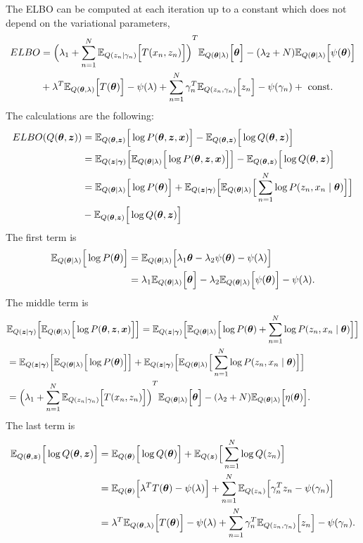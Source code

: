 The ELBO can be computed at each iteration up to a constant which does not depend on the variational parameters,
\[
  \begin{aligned}
    ELBO &= {\Big( \lambda_{1} + \sum_{n=1}^{N} \mathbb{E}_{Q(z_{n}\mid \gamma_{n})}\Big[T(x_{n},z_{n})\Big]\Big)}^{T}\mathbb{E}_{Q(\bm{\theta} \mid \lambda)}\Big[\bm{\theta}\Big] - (\lambda_{2} + N) \mathbb{E}_{Q(\bm{\theta} \mid \lambda)}\Big[\psi(\bm{\theta})\Big]\\
    &+ \lambda ^{T} \mathbb{E}_{Q(\bm{\theta}, \lambda)}\Big[T(\bm{\theta})\Big] - \psi(\lambda) + \sum_{n=1}^{N}\gamma_{n}^{T}\mathbb{E}_{Q(z_{n}, \gamma_{n})}\Big[z_{n}\Big] - \psi(\gamma_{n}) + \text{ const. }
  \end{aligned}
\]
The calculations are the following:
\[
  \begin{aligned}
   ELBO(Q(\bm{\theta}, \bm{z})) &= \mathbb{E}_{Q(\bm{\theta}, \bm{z})}\Big[\log{P(\bm{\theta}, \bm{z}, \bm{x})}\Big] - \mathbb{E}_{Q(\bm{\theta}, \bm{z})}\Big[\log{Q(\bm{\theta}, \bm{z})}\Big]\\
  &= \mathbb{E}_{Q(\bm{z} \mid \bm{\gamma})}\Big[\mathbb{E}_{Q(\bm{\theta} \mid \lambda)}\Big[\log P(\bm{\theta}, \bm{z}, \bm{x})\Big]\Big]- \mathbb{E}_{Q(\bm{\theta}, \bm{z})}\Big[\log{Q(\bm{\theta}, \bm{z})}\Big]\\
  &= \mathbb{E}_{Q(\bm{\theta} \mid \lambda)}\Big[\log P(\bm{\theta})\Big] + \mathbb{E}_{Q(\bm{z} \mid \bm{\gamma})}\Big[\mathbb{E}_{Q(\bm{\theta} \mid \lambda)}\Big[\sum_{n=1}^{N} \log P(z_{n}, x_{n} \mid \bm{\theta})\Big]\Big]\\
  &- \mathbb{E}_{Q(\bm{\theta}, \bm{z})}\Big[\log{Q(\bm{\theta}, \bm{z})}\Big]
  \end{aligned}
\]
The first term is
\[
  \begin{aligned}
  \mathbb{E}_{Q(\bm{\theta} \mid \lambda)}\Big[\log P(\bm{\theta})\Big] &=  \mathbb{E}_{Q(\bm{\theta} \mid \lambda)}\Big[ \lambda_{1}\bm{\theta} - \lambda_{2}\psi(\bm{\theta}) - \psi(\lambda) \Big]\\
  &= \lambda_{1}  \mathbb{E}_{Q(\bm{\theta} \mid \lambda)}\Big[\bm{\theta}\Big] - \lambda_{2}\mathbb{E}_{Q(\bm{\theta} \mid \lambda)}\Big[\psi(\bm{\theta})\Big] - \psi(\lambda).
  \end{aligned}
\]
The middle term is 
\[
 \begin{aligned}
    &\mathbb{E}_{Q(\bm{z} \mid \bm{\gamma})}\Big[\mathbb{E}_{Q(\bm{\theta} \mid \lambda)}\Big[\log P(\bm{\theta}, \bm{z}, \bm{x})\Big]\Big] =  \mathbb{E}_{Q(\bm{z} \mid \bm{\gamma})}\Big[\mathbb{E}_{Q(\bm{\theta} \mid \lambda)}\Big[\log P(\bm{\theta}) + \sum_{n=1}^{N} \log P(z_{n}, x_{n} \mid \bm{\theta})\Big]\Big]\\
    &= \mathbb{E}_{Q(\bm{z} \mid \bm{\gamma})}\Big[\mathbb{E}_{Q(\bm{\theta} \mid \lambda)}\Big[\log P(\bm{\theta})\Big]\Big] + \mathbb{E}_{Q(\bm{z} \mid \bm{\gamma})}\Big[\mathbb{E}_{Q(\bm{\theta} \mid \lambda)}\Big[\sum_{n=1}^{N} \log P(z_{n}, x_{n} \mid \bm{\theta})\Big]\Big]\\
    &= {\Big( \lambda_{1} + \sum_{n=1}^{N} \mathbb{E}_{Q(z_{n}\mid \gamma_{n})}\Big[T(x_{n},z_{n})\Big]\Big)}^{T}\mathbb{E}_{Q(\bm{\theta} \mid \lambda)}\Big[\bm{\theta}\Big] - (\lambda_{2} + N) \mathbb{E}_{Q(\bm{\theta} \mid \lambda)}\Big[\eta(\bm{\theta})\Big].
 \end{aligned}
\]
The last term is
\[
  \begin{aligned}
  \mathbb{E}_{Q(\bm{\theta}, \bm{z})}\Big[\log{Q(\bm{\theta}, \bm{z})}\Big]  &= \mathbb{E}_{Q(\bm{\theta})}\Big[\log Q(\bm{\theta})\Big] +  \mathbb{E}_{Q(\bm{z})}\Big[ \sum_{n=1}^{N} \log Q(z_{n})\Big]\\
  &= \mathbb{E}_{Q(\bm{\theta})}\Big[\lambda^{T}T(\bm{\theta}) - \psi(\lambda)\Big] + \sum_{n=1}^{N} \mathbb{E}_{Q(z_{n})}\Big[\gamma_{n}^{T}z_{n} - \psi(\gamma_{n})\Big]\\
  &= \lambda ^{T} \mathbb{E}_{Q(\bm{\theta}, \lambda)}\Big[T(\bm{\theta})\Big] - \psi(\lambda) + \sum_{n=1}^{N}\gamma_{n}^{T}\mathbb{E}_{Q(z_{n}, \gamma_{n})}\Big[z_{n}\Big] - \psi(\gamma_{n}).
  \end{aligned}
\]

